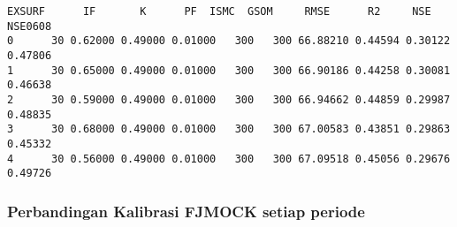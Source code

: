 \documentclass[11pt]{article}
\makeatletter
\newcommand{\boxspacing}{\kern\kvtcb@left@rule\kern\kvtcb@boxsep}
\newcommand{\prompt}[4]{
        \ttfamily\llap{{\color{#2}[#3]:\hspace{3pt}#4}}\vspace{-\baselineskip}
    }
\makeatother
\begin{document}
            \begin{tcolorbox}[breakable, size=fbox, boxrule=.5pt, pad at break*=1mm, opacityfill=0]
\prompt{Out}{outcolor}{0}{\boxspacing}
\begin{Verbatim}[commandchars=\\\{\}]
   EXSURF      IF       K      PF  ISMC  GSOM     RMSE      R2     NSE  NSE0608
0      30 0.62000 0.49000 0.01000   300   300 66.88210 0.44594 0.30122  0.47806
1      30 0.65000 0.49000 0.01000   300   300 66.90186 0.44258 0.30081  0.46638
2      30 0.59000 0.49000 0.01000   300   300 66.94662 0.44859 0.29987  0.48835
3      30 0.68000 0.49000 0.01000   300   300 67.00583 0.43851 0.29863  0.45332
4      30 0.56000 0.49000 0.01000   300   300 67.09518 0.45056 0.29676  0.49726
\end{Verbatim}
\end{tcolorbox}
        
    \hypertarget{perbandingan-kalibrasi-fjmock-setiap-periode}{%
\subsubsection{Perbandingan Kalibrasi FJMOCK setiap
periode}\label{perbandingan-kalibrasi-fjmock-setiap-periode}}
\end{document}
